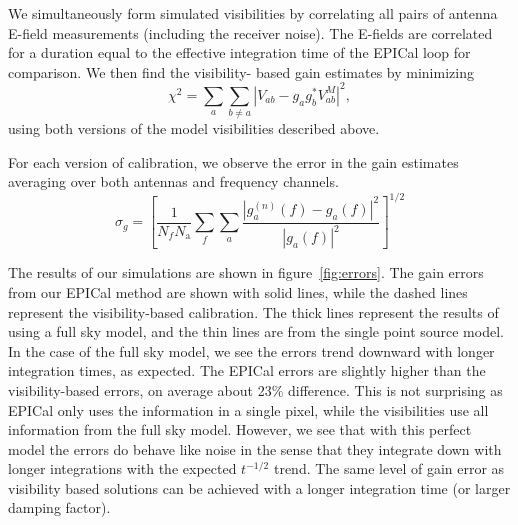 \documentclass[a4paper,fleqn,usenatbib]{mnras}
\newcommand{\Nant}{\ensuremath{N_{\mathrm{a}}}}
\begin{document}
We simultaneously form simulated visibilities by correlating all pairs of antenna E-field 
measurements (including the receiver noise). The E-fields are correlated for a duration equal to 
the effective integration time of the EPICal loop for comparison. We then find the visibility-
based gain estimates by minimizing
\begin{equation}\label{eq:vis_cal}
\chi^2 = \sum_a\sum_{b\ne a} \left|V_{ab}-g_a g_b^* V^M_{ab}\right|^2,
\end{equation}
using both versions of the model visibilities described above.

 For each version of calibration, we observe the error in the gain estimates averaging over both 
 antennas and frequency channels.
\begin{equation}\label{eq:gain_error}
\sigma_g = \left[\frac{1}{N_f \Nant} \sum_f \sum_a \frac{\left|g^{(n)}_a(f)-g_a(f)\right|^2}{\left|g_a(f)\right|^2}\right]^{1/2}
\end{equation}

The results of our simulations are shown in figure~\ref{fig:errors}. The gain errors from our 
EPICal method are shown with solid lines, while the dashed lines represent the visibility-based 
calibration. The thick lines represent the results of using a full sky model, and the thin lines are 
from the single point source model.  In the case of the full sky model, we see the errors trend 
downward with longer integration times, as expected. The EPICal errors are slightly higher than 
the visibility-based errors, on average about 23\% difference. This is not surprising as EPICal 
only uses the information in a single pixel, while the visibilities use all information from the full 
sky model. However, we see that with this perfect model the errors do behave like noise
in the sense that they integrate down with longer integrations with the expected $t^{-1/2}$ 
trend. 
The same level of gain error as visibility based solutions can be achieved with a longer integration time (or larger damping 
factor).
\end{document}
